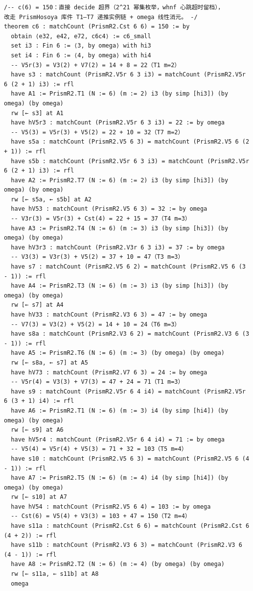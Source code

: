 \documentclass[11pt]{article}
\begin{document}
\begin{lstlisting}
/-- c(6) = 150：直接 decide 超界（2^21 幂集枚举，whnf 心跳超时留档），
改走 PrismHosoya 库件 T1–T7 递推实例链 + omega 线性消元。 -/
theorem c6 : matchCount (PrismR2.Cst 6 6) = 150 := by
  obtain ⟨e32, e42, e72, c6c4⟩ := c6_small
  set i3 : Fin 6 := ⟨3, by omega⟩ with hi3
  set i4 : Fin 6 := ⟨4, by omega⟩ with hi4
  -- V5r(3) = V3(2) + V7(2) = 14 + 8 = 22（T1 m=2）
  have s3 : matchCount (PrismR2.V5r 6 3 i3) = matchCount (PrismR2.V5r 6 (2 + 1) i3) := rfl
  have A1 := PrismR2.T1 (N := 6) (m := 2) i3 (by simp [hi3]) (by omega) (by omega)
  rw [← s3] at A1
  have hV5r3 : matchCount (PrismR2.V5r 6 3 i3) = 22 := by omega
  -- V5(3) = V5r(3) + V5(2) = 22 + 10 = 32（T7 m=2）
  have s5a : matchCount (PrismR2.V5 6 3) = matchCount (PrismR2.V5 6 (2 + 1)) := rfl
  have s5b : matchCount (PrismR2.V5r 6 3 i3) = matchCount (PrismR2.V5r 6 (2 + 1) i3) := rfl
  have A2 := PrismR2.T7 (N := 6) (m := 2) i3 (by simp [hi3]) (by omega) (by omega)
  rw [← s5a, ← s5b] at A2
  have hV53 : matchCount (PrismR2.V5 6 3) = 32 := by omega
  -- V3r(3) = V5r(3) + Cst(4) = 22 + 15 = 37（T4 m=3）
  have A3 := PrismR2.T4 (N := 6) (m := 3) i3 (by simp [hi3]) (by omega) (by omega)
  have hV3r3 : matchCount (PrismR2.V3r 6 3 i3) = 37 := by omega
  -- V3(3) = V3r(3) + V5(2) = 37 + 10 = 47（T3 m=3）
  have s7 : matchCount (PrismR2.V5 6 2) = matchCount (PrismR2.V5 6 (3 - 1)) := rfl
  have A4 := PrismR2.T3 (N := 6) (m := 3) i3 (by simp [hi3]) (by omega) (by omega)
  rw [← s7] at A4
  have hV33 : matchCount (PrismR2.V3 6 3) = 47 := by omega
  -- V7(3) = V3(2) + V5(2) = 14 + 10 = 24（T6 m=3）
  have s8a : matchCount (PrismR2.V3 6 2) = matchCount (PrismR2.V3 6 (3 - 1)) := rfl
  have A5 := PrismR2.T6 (N := 6) (m := 3) (by omega) (by omega)
  rw [← s8a, ← s7] at A5
  have hV73 : matchCount (PrismR2.V7 6 3) = 24 := by omega
  -- V5r(4) = V3(3) + V7(3) = 47 + 24 = 71（T1 m=3）
  have s9 : matchCount (PrismR2.V5r 6 4 i4) = matchCount (PrismR2.V5r 6 (3 + 1) i4) := rfl
  have A6 := PrismR2.T1 (N := 6) (m := 3) i4 (by simp [hi4]) (by omega) (by omega)
  rw [← s9] at A6
  have hV5r4 : matchCount (PrismR2.V5r 6 4 i4) = 71 := by omega
  -- V5(4) = V5r(4) + V5(3) = 71 + 32 = 103（T5 m=4）
  have s10 : matchCount (PrismR2.V5 6 3) = matchCount (PrismR2.V5 6 (4 - 1)) := rfl
  have A7 := PrismR2.T5 (N := 6) (m := 4) i4 (by simp [hi4]) (by omega) (by omega)
  rw [← s10] at A7
  have hV54 : matchCount (PrismR2.V5 6 4) = 103 := by omega
  -- Cst(6) = V5(4) + V3(3) = 103 + 47 = 150（T2 m=4）
  have s11a : matchCount (PrismR2.Cst 6 6) = matchCount (PrismR2.Cst 6 (4 + 2)) := rfl
  have s11b : matchCount (PrismR2.V3 6 3) = matchCount (PrismR2.V3 6 (4 - 1)) := rfl
  have A8 := PrismR2.T2 (N := 6) (m := 4) (by omega) (by omega)
  rw [← s11a, ← s11b] at A8
  omega


\end{lstlisting}
\end{document}
